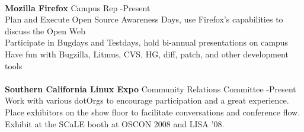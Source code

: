 \documentclass{res}
\begin{document}
\begin{resume}
\begin{tabbing}
\\

    {\bf Mozilla Firefox} \> \hspace{0.8in}Campus Rep -Present\\
	 Plan and Execute Open Source Awareness Days, use Firefox's capabilities to discuss the Open Web \\
	 Participate in Bugdays and Testdays, hold bi-annual presentations on campus \\
	 Have fun with Bugzilla, Litmus, CVS, HG, diff, patch, and other development tools\\

\\

    {\bf Southern California Linux Expo} \> \hspace{0.5in}Community Relations Committee -Present\\
	 Work with various dotOrgs to encourage participation and a great experience.\\
	 Place exhibitors on the show floor to facilitate conversations and conference flow.\\
	 Exhibit at the SCaLE booth at OSCON 2008 and LISA '08.
	 \end{tabbing}

\end{resume}
\end{document}
